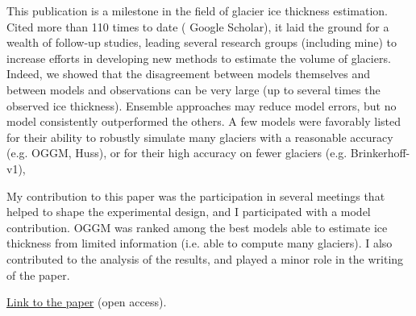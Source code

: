 This publication is a milestone in the field of glacier ice thickness estimation. Cited more than 110 times to date (
Google Scholar), it laid the ground for a wealth of follow-up studies, leading several research groups (including mine)
to increase efforts in developing new methods to estimate the volume of glaciers. Indeed, we showed that the
disagreement between models themselves and between models and observations can be very large (up to several times the
observed ice thickness). Ensemble approaches may reduce model errors, but no model consistently outperformed the others.
A few models were favorably listed for their ability to robustly simulate many glaciers with a reasonable accuracy (e.g.
OGGM, Huss), or for their high accuracy on fewer glaciers (e.g. Brinkerhoff-v1),

My contribution to this paper was the participation in several meetings that helped to shape the experimental design,
and I participated with a model contribution. OGGM was ranked among the best models able to estimate ice thickness from
limited information (i.e. able to compute many glaciers). I also contributed to the analysis of the
results, and played a minor role in the writing of the paper.


\href{https://doi.org/10.5194/tc-11-949-2017}{Link to the paper} (open access).


\iflong  \else \fi 

